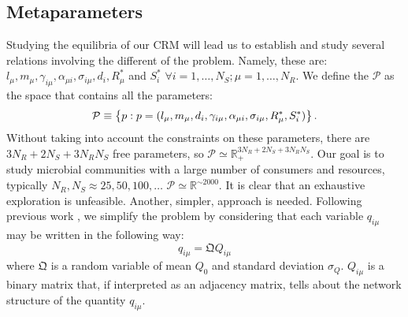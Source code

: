 \documentclass[12pt, titlepage]{report}
\begin{document}
\subsection{Metaparameters}\label{sec : intro metaparameters and matrix properties}
Studying the equilibria of our CRM will lead us to establish and study several relations involving the different  of the problem. Namely, these are: $l_\mu, m_\mu, \gamma_{i\mu}, \alpha_{\mu i}, \sigma_{i\mu}, d_i, R^*_\mu$ and $S^*_i$ $\forall i=1, \dots, N_S; \mu=1, \dots, N_R$.
We define the  $\mathcal{P}$ as the space that contains all the parameters:
\begin{equation}
\mathcal{P} \equiv \left\{ p: p = (l_\mu,  m_\mu,d_i,  \gamma_{i\mu}, \alpha_{\mu i}, \sigma_{i\mu}, R^*_\mu, S^*_i) \right\}.
\end{equation}
Without taking into account the constraints on these parameters, there are $3N_R+2N_S+3N_RN_S$ free parameters, so $\mathcal{P} \simeq \mathbb{R}_+^{3 N_R+2 N_S + 3 N_R N_S}$.
Our goal is to study microbial communities with a large number of consumers and resources, typically $N_R, N_S \approx 25, 50, 100, \dots$ \ie $\mathcal{P} \simeq \mathbb{R}^{\sim 2000}$. It is clear that %
an exhaustive exploration is unfeasible. Another, simpler, approach is needed.
Following previous work \cite{pascual-garcia_mutualism_2017}, we simplify the problem by considering that each variable $q_{i\mu}$ may be written in the following way:
 \begin{equation}
 q_{i\mu} = \mathfrak{Q} Q_{i\mu}
 \end{equation}
where $\mathfrak{Q}$ is a random variable of mean $Q_0$ and standard deviation $\sigma_Q$. $Q_{i\mu}$ is a binary matrix that, if interpreted as an adjacency matrix, tells about the network structure of the quantity $q_{i\mu}$.
\end{document}
